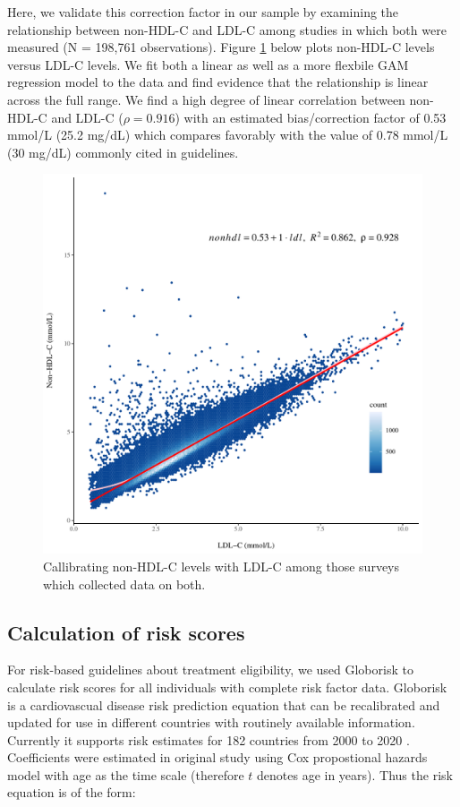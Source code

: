 \documentclass[12pt]{article}
\begin{document}
\begin{appendix}
\begin{refsection}
    Here, we validate this correction factor in our sample by examining the relationship between non-HDL-C and LDL-C among studies in which both were measured (N = 198,761 observations). Figure \ref{fig:callibration} below plots non-HDL-C levels versus LDL-C levels. We fit both a linear as well as a more flexbile GAM regression model to the data and find evidence that the relationship is linear across the full range. We find a high degree of linear correlation between non-HDL-C and LDL-C ($\rho = 0.916$) with an estimated bias/correction factor of 0.53 mmol/L (25.2 mg/dL) which compares favorably with the value of 0.78 mmol/L (30 mg/dL) commonly cited in guidelines.

    \begin{figure}[H]
    \centering
    \includegraphics[width=\textwidth]{../3_figures/figS1_calibration.pdf}
    \caption{Callibrating non-HDL-C levels with LDL-C among those surveys which collected data on both.}
    \label{fig:callibration}
    \end{figure}

    \newpage 

    \subsection{Calculation of risk scores} \label{sec:risk_scores}
    For risk-based guidelines about treatment eligibility, we used Globorisk \cite{hajifathalian_novel_2015} to calculate risk scores for all individuals with complete risk factor data. Globorisk is a cardiovascual disease risk prediction equation that can be recalibrated and updated for use in different countries with routinely available information. Currently it supports risk estimates for 182 countries from 2000 to 2020 \cite{ueda_laboratory-based_2017}. Coefficients were estimated in original study using Cox propostional hazards model with age as the time scale (therefore $t$ denotes age in years). Thus the risk equation is of the form: 
    

\end{refsection}
\end{appendix}
\end{document}
